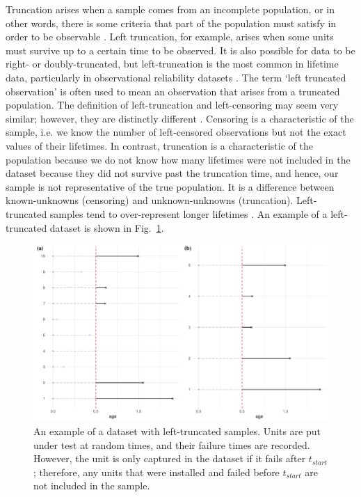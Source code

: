 Truncation arises when a sample comes from an incomplete population, or in other words, there is some criteria that part of the population must satisfy in order to be observable \citep{guo1993}. Left truncation, for example, arises when some units must survive up to a certain time to be observed. It is also possible for data to be right- or doubly-truncated, but left-truncation is the most common in lifetime data, particularly in observational reliability datasets \citep{Emura2022}. The term `left truncated observation' is often used to mean an observation that arises from a truncated population. The definition of left-truncation and left-censoring may seem very similar; however, they are distinctly different \citep{mitra2013}. Censoring is a characteristic of the sample, i.e. we know the number of left-censored observations but not the exact values of their lifetimes. In contrast, truncation is a characteristic of the population because we do not know how many lifetimes were not included in the dataset because they did not survive past the truncation time, and hence, our sample is not representative of the true population. It is a difference between known-unknowns (censoring) and unknown-unknowns (truncation). Left-truncated samples tend to over-represent longer lifetimes \citep{guo1993}. An example of a left-truncated dataset is shown in Fig.~\ref{fig:left_trunc_example}.

\begin{figure}[h]
    \centering
    \includegraphics[width=1\textwidth]{./figures/ch-2/left_truncation_example.pdf}
    \caption{An example of a dataset with left-truncated samples. Units are put under test at random times, and their failure times are recorded. However, the unit is only captured in the dataset if it fails after $t_{start}$; therefore, any units that were installed and failed before $t_{start}$ are not included in the sample.}
    \label{fig:left_trunc_example}
\end{figure}

